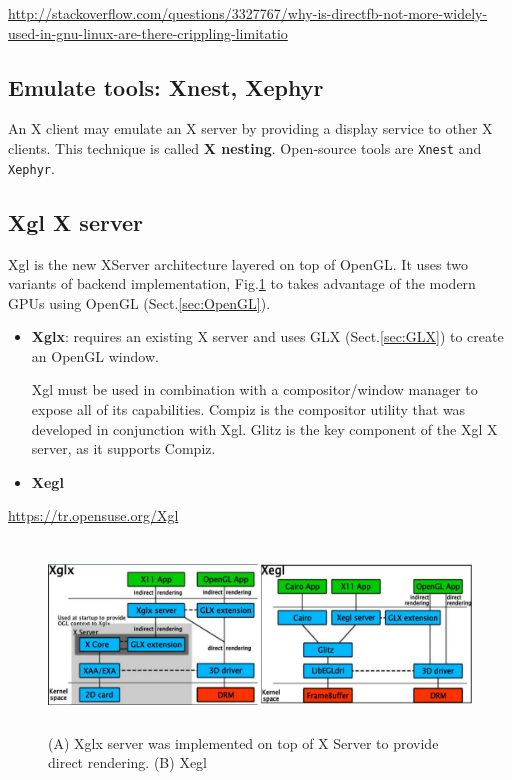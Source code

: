 \url{http://stackoverflow.com/questions/3327767/why-is-directfb-not-more-widely-used-in-gnu-linux-are-there-crippling-limitatio}

\subsection{Emulate tools: Xnest, Xephyr}

An X client may emulate an X server by providing a display service
to other X clients. This technique is called {\bf X nesting}. Open-source tools
are \verb!Xnest! and \verb!Xephyr!.

\subsection{Xgl X server}
\label{sec:Xgl}

Xgl is the new XServer architecture layered on top of OpenGL.
It uses two variants of backend implementation, Fig.\ref{fig:Xglx_Xegl} 
to takes advantage of the modern GPUs using OpenGL (Sect.\ref{sec:OpenGL}).
\begin{itemize}
  \item {\bf Xglx}: requires an existing X server and uses GLX
  (Sect.\ref{sec:GLX}) to create an OpenGL window.
  
Xgl must be used in combination with a compositor/window manager to expose all
of its capabilities. Compiz is the compositor utility that was developed in
conjunction with Xgl. Glitz is the key component of the Xgl X server, as it
supports Compiz.

  \item {\bf Xegl}
\end{itemize}
\url{https://tr.opensuse.org/Xgl}

\begin{figure}[hbt]
  \centerline{\includegraphics[height=5cm,
    angle=0]{./images/Xglx_Xegl.eps}}
\caption{(A) Xglx server was implemented on top of X Server to provide direct
rendering. (B) Xegl}
\label{fig:Xglx_Xegl}
\end{figure}

